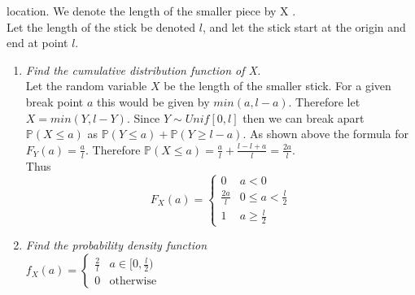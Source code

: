 \documentclass[12pt, letterpaper]{article}
\newcommand{\Pro}{\mathbb{P}}
\begin{document}
\begin{enumerate}
{location. We denote the length of the smaller piece by X .}\\
	Let the length of the stick be denoted $l$, and let the stick start at the origin and end at point $l$.
	\begin{enumerate}
		\item \textit{Find the cumulative distribution function of X.}\\
		Let the random variable $X$ be the length of the smaller stick.
		For a given break point $a$ this would be given by $min(a,l-a)$.
		Therefore let $X = min(Y,l-Y)$.  Since $Y \sim Unif[0,l]$ then we can break apart $\Pro(X \leq a)$ as $\Pro(Y \leq a) + \Pro(Y\geq l-a)$.
		As shown above the formula for $F_Y(a) = \frac{a}{l}$.  Therefore 
		$\Pro(X \leq a) = \frac{a}{l} + \frac{l-l+a}{l} = \frac{2a}{l}$.\\
		 Thus 
		 $$
		 F_X(a) = \begin{cases} 0 & a < 0\\ \frac{2a}{l} & 0 \leq a < \frac{l}{2}\\
		 1 & a \geq \frac{l}{2}\end{cases}
		 $$
		 \item \textit{Find the probability density function}\\
		 $f_X(a) = \begin{cases}\frac{2}{l} & a \in [0,\frac{l}{2})\\
		 0 & \text{otherwise} \end{cases}$
	\end{enumerate}
\end{enumerate}
\end{document}
